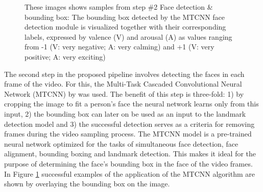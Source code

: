 \begin{figure}[htbp]
  \hfill
  \caption[ER pipeline step \#2: Face detection \& bounding box]{These images shows samples from step \#2 Face detection \& bounding box: The bounding box detected by the MTCNN \citep{Zhang:2016:MTCCN} face detection module is visualized together with their corresponding labels, expressed by valence (V) and arousal (A) as values ranging from -1 (V: very negative; A: very calming) and +1 (V: very positive; A: very exciting)}
  \label{fig:MethodologyBoundingBox}
\end{figure}

The second step in the proposed pipeline involves detecting the faces in each frame of the video. For this, the Multi-Task Cascaded Convolutional Neural Network (MTCNN) by \citet{Zhang:2016:MTCCN} was used. The benefit of this step is three-fold: 1) by cropping the image to fit a person's face the neural network learns only from this input, 2) the bounding box can later on be used as an input to the landmark detection model and 3) the successful detection serves as a criteria for removing frames during the video sampling process.
\newline\newline
The MTCNN \citep{Zhang:2016:MTCCN} model is a pre-trained neural network optimized for the tasks of simultaneous face detection, face alignment, bounding boxing and landmark detection. This makes it ideal for the purpose of determining the face's bounding box in the face of the video frames. In Figure \ref{fig:MethodologyBoundingBox} successful examples of the application of the MTCNN algorithm are shown by overlaying the bounding box on the image.

\vspace{0.5cm}
